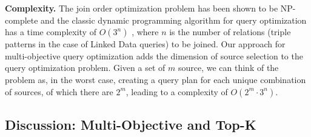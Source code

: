 \textbf{Complexity.} The join order optimization problem has been
shown to be NP-complete \cite{vance_rapid_1996} and the classic
dynamic programming algorithm for query optimization has a time
complexity of $O(3^n)$ \cite{kossmann_iterative_2000}, where $n$ is
the number of relations (triple patterns in the case of Linked Data
queries) to be joined. Our approach for multi-objective query
optimization adds the dimension of source selection to the query
optimization problem. Given a set of $m$ source, we can think of the
problem as, in the worst case, creating a query plan for each unique
combination of sources, of which there are $2^m$, leading to a
complexity of $O(2^m \cdot 3^n)$.

\subsection{Discussion: Multi-Objective and Top-K}











